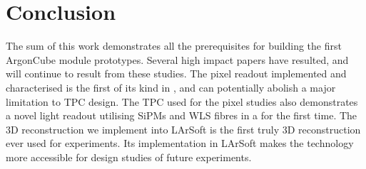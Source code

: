 \chapter{Conclusion}
\label{chap:conclusion}

The sum of this work demonstrates all the prerequisites for building the first ArgonCube module prototypes.
Several high impact papers have resulted, and will continue to result from these studies.
The pixel readout implemented and characterised is the first of its kind in \lar{}, and can potentially abolish a major limitation to TPC design.
The TPC used for the pixel studies also demonstrates a novel light readout utilising SiPMs and WLS fibres in a \lartpc{} for the first time.
The 3D reconstruction we implement into LArSoft is the first truly 3D reconstruction ever used for \lar{} experiments.
Its implementation in LArSoft makes the technology more accessible for design studies of future experiments.